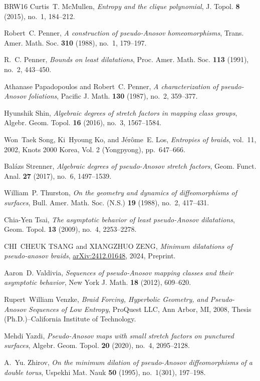 \documentclass{amsart}
\theoremstyle{definition}
\theoremstyle{remark}
\begin{document}
\begin{thebibliography}{BRW16}
Curtis~T. McMullen, \emph{Entropy and the clique polynomial}, J. Topol.
  \textbf{8} (2015), no.~1, 184--212. 

Robert~C. Penner, \emph{A construction of pseudo-{A}nosov homeomorphisms},
  Trans. Amer. Math. Soc. \textbf{310} (1988), no.~1, 179--197. 

R.~C. Penner, \emph{Bounds on least dilatations}, Proc. Amer. Math. Soc.
  \textbf{113} (1991), no.~2, 443--450. 

Athanase Papadopoulos and Robert~C. Penner, \emph{A characterization of
  pseudo-{A}nosov foliations}, Pacific J. Math. \textbf{130} (1987), no.~2,
  359--377. 

Hyunshik Shin, \emph{Algebraic degrees of stretch factors in mapping class
  groups}, Algebr. Geom. Topol. \textbf{16} (2016), no.~3, 1567--1584.

Won~Taek Song, Ki~Hyoung Ko, and J\'er\^ome~E. Los, \emph{Entropies of braids},
  vol.~11, 2002, Knots 2000 Korea, Vol. 2 (Yongpyong), pp.~647--666.

Bal\'azs Strenner, \emph{Algebraic degrees of pseudo-{A}nosov stretch factors},
  Geom. Funct. Anal. \textbf{27} (2017), no.~6, 1497--1539. 

William~P. Thurston, \emph{On the geometry and dynamics of diffeomorphisms of
  surfaces}, Bull. Amer. Math. Soc. (N.S.) \textbf{19} (1988), no.~2, 417--431.

Chia-Yen Tsai, \emph{The asymptotic behavior of least pseudo-{A}nosov
  dilatations}, Geom. Topol. \textbf{13} (2009), no.~4, 2253--2278.

CHI~CHEUK TSANG and XIANGZHUO ZENG, \emph{Minimum dilatations of pseudo-anosov
  braids}, \url{arXiv:2412.01648}, 2024, Preprint.

Aaron~D. Valdivia, \emph{Sequences of pseudo-{A}nosov mapping classes and their
  asymptotic behavior}, New York J. Math. \textbf{18} (2012), 609--620.

Rupert~William Venzke, \emph{Braid {F}orcing, {H}yperbolic {G}eometry, and
  {P}seudo-{A}nosov {S}equences of {L}ow {E}ntropy}, ProQuest LLC, Ann Arbor,
  MI, 2008, Thesis (Ph.D.)--California Institute of Technology. 

Mehdi Yazdi, \emph{Pseudo-{A}nosov maps with small stretch factors on punctured
  surfaces}, Algebr. Geom. Topol. \textbf{20} (2020), no.~4, 2095--2128.

A.~Yu. Zhirov, \emph{On the minimum dilation of pseudo-{A}nosov diffeomorphisms
  of a double torus}, Uspekhi Mat. Nauk \textbf{50} (1995), no.~1(301),
  197--198. 

\end{thebibliography}

\end{document}
